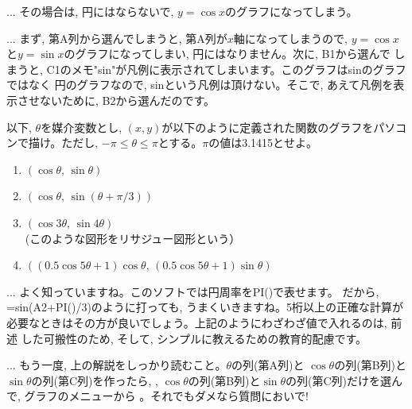 \begin{freqmiss}{\small{} ... 
その場合は, 円にはならないで, $y=\cos x$のグラフになってしまう。\\}\end{freqmiss}

\begin{faq}{\small{} ... まず, 第A列から選んでしまうと, 第A列が$x$軸になってしまうので, 
$y=\cos x$と$y=\sin x$のグラフになってしまい, 円にはなりません。次に, B1から選んで
しまうと, C1のメモ"sin"が凡例に表示されてしまいます。このグラフはsinのグラフではなく
円のグラフなので, sinという凡例は頂けない。そこで, あえて凡例を表示させないために, 
B2から選んだのです。\\}\end{faq}

\begin{q}\label{q:comp_graph1} 以下, $\theta$を媒介変数とし, $(x, y)$が以下のように定義された関数のグラフをパソコンで描け。ただし, 
$-\pi \le \theta \le \pi$とする。$\pi$の値は3.1415とせよ。
\begin{enumerate}
\item $(\cos \theta,\, \sin \theta)$
\item $(\cos \theta,\, \sin (\theta+\pi/3))$
\item $(\cos 3\theta,\,  \sin 4\theta)$\\(このような図形をリサジュー図形という）
\item $((0.5\cos 5\theta+1) \cos \theta,\, (0.5\cos 5\theta+1) \sin \theta)$
\end{enumerate}\end{q}

\begin{faq}{\small{} ... よく知っていますね。このソフトでは円周率をPI()で表せます。
だから, =sin(A2+PI()/3)のように打っても, うまくいきますね。5桁以上の正確な計算が
必要なときはその方が良いでしょう。上記のようにわざわざ値で入れるのは, 前述
した可搬性のため, そして, シンプルに教えるための教育的配慮です。\\}\end{faq}

\begin{faq}{\small{} ... もう一度, 上の解説をしっかり読むこと。$\theta$の列(第A列)と
$\cos\theta$の列(第B列)と$\sin\theta$の列(第C列)を作ったら, 
, 
$\cos\theta$の列(第B列)と$\sin\theta$の列(第C列)だけを選んで, グラフのメニューから
。それでもダメなら質問においで!}\end{faq}
\vv



